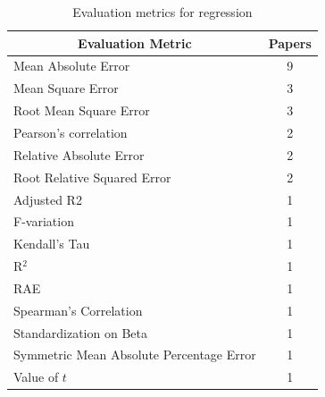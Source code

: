 \begin{table}[htb]
\centering
\caption{Evaluation metrics for regression}
\label{tab:rsl_regr_evaluation}
\footnotesize
\begin{tabular}{@{}lc@{}}

\toprule
\multicolumn{1}{c}{\textbf{Evaluation Metric}} & \textbf{Papers} \\ \midrule
Mean Absolute Error & 9 \\
Mean Square Error & 3 \\
Root Mean Square Error & 3 \\
Pearson's correlation & 2 \\
Relative Absolute Error & 2 \\
Root Relative Squared Error & 2 \\
Adjusted R2 & 1 \\
F-variation & 1 \\
Kendall's Tau & 1 \\
R$^2$ & 1 \\
RAE & 1 \\
Spearman's Correlation & 1 \\
Standardization on Beta & 1 \\
Symmetric Mean Absolute Percentage Error & 1 \\
Value of $t$ & 1 \\ \bottomrule
\end{tabular}
\end{table}

